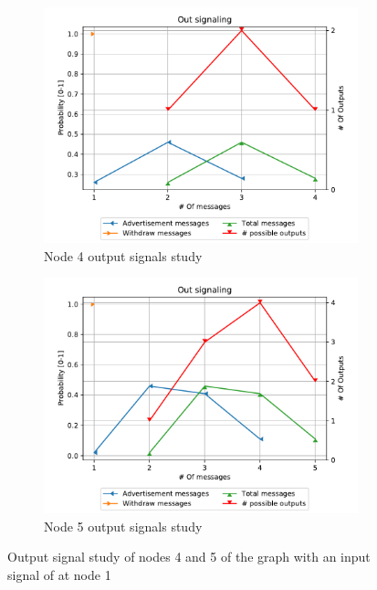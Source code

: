 \begin{figure}[h]
     \centering
     \begin{subfigure}[b]{0.45\textwidth}
         \centering
         \includegraphics[width=\textwidth]{images/signal_study/fig_4/fig_4_4_signaling_nmessage_prob.pdf}
		 \caption{Node \num{4} output signals study}
         \label{fig:signal_node4}
     \end{subfigure}
     \hfill
     \begin{subfigure}[b]{0.45\textwidth}
         \centering
         \includegraphics[width=\textwidth]{images/signal_study/fig_4/fig_4_5_signaling_nmessage_prob.pdf}
		 \caption{Node \num{5} output signals study}
         \label{fig:signal_node5}
     \end{subfigure}
		\caption{Output signal study of nodes \num{4} and \num{5} of the graph
			 with an input signal of  at node \num{1}}
        \label{fig:signal_griffin_fig4}
\end{figure}

